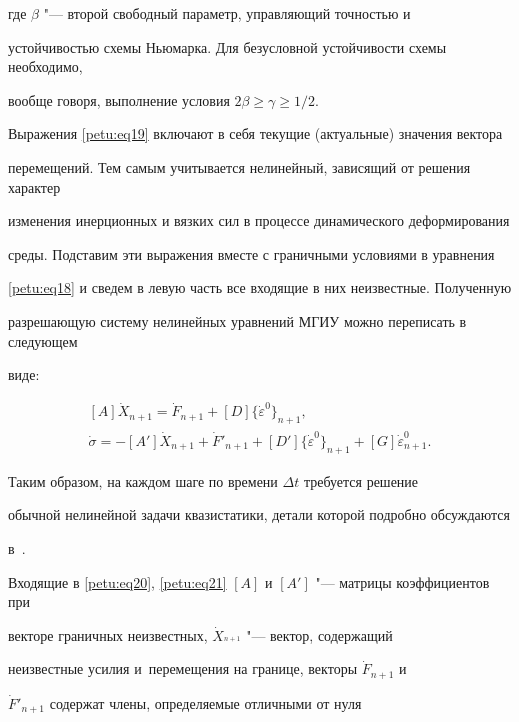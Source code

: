 где $\beta $ "--- второй свободный параметр, управляющий точностью и

устойчивостью схемы Ньюмарка. Для безусловной устойчивости схемы необходимо,

вообще говоря, выполнение условия $2\beta \ge \gamma \ge

1/2$.



Выражения \eqref{petu:eq19} включают в себя текущие (актуальные) значения вектора

перемещений. Тем самым учитывается нелинейный, зависящий от решения характер

изменения инерционных и вязких сил в процессе динамического деформирования

среды. Подставим эти выражения вместе с граничными условиями в уравнения

\eqref{petu:eq18} и сведем в левую часть все входящие в них неизвестные. Полученную

разрешающую систему нелинейных уравнений МГИУ можно переписать в следующем

виде:

\begin{gather}

\label{petu:eq20}

[A]\dot {X}_{n+1} =\dot {F}_{n+1} +[D]\big\{\dot {\varepsilon }^0\big\}_{n+1},\\

\label{petu:eq21}

\dot {\sigma }=-[A']\dot {X}_{n+1} +\dot {F}'_{n+1} +[D']\big\{\dot

{\varepsilon }^0 \big\}_{n+1} +[G]\dot {\varepsilon }^0_{n+1}.

\end{gather}

Таким образом, на каждом шаге по времени $\Delta t$ требуется решение

обычной нелинейной задачи квазистатики, детали которой подробно обсуждаются

в~\cite{petu:bib14,petu:bib15}.



Входящие в \eqref{petu:eq20}, \eqref{petu:eq21} $[A]$ и $[A']$ "--- матрицы коэффициентов при

векторе граничных неизвестных, $\dot {X}_{^{n+1}}$ "--- вектор, содержащий

неизвестные усилия и~перемещения на границе, векторы $\dot {F}_{n+1}$ и

${\dot {F}}'_{n+1}$ содержат члены, определяемые отличными от нуля

